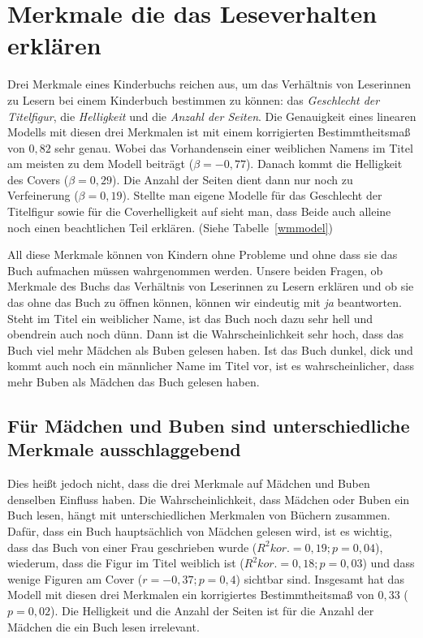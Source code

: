 \chapter{Merkmale die das Leseverhalten erklären}

Drei Merkmale eines Kinderbuchs reichen aus, um das Verhältnis von
Leserinnen zu Lesern bei einem Kinderbuch bestimmen zu können: das
\emph{Geschlecht der Titelfigur}, die \emph{Helligkeit} und die
\emph{Anzahl der Seiten}. Die Genauigkeit eines linearen Modells mit
diesen drei Merkmalen ist mit einem korrigierten Bestimmtheitsmaß von
$0{,}82$ sehr genau. Wobei das Vorhandensein einer weiblichen Namens im
Titel am meisten zu dem Modell beiträgt ($\beta=-0{,}77$). Danach kommt
die Helligkeit des Covers ($\beta=0{,}29$). Die Anzahl der Seiten dient
dann nur noch zu Verfeinerung ($\beta=0{,}19$). Stellte man eigene
Modelle für das Geschlecht der Titelfigur sowie für die Coverhelligkeit
auf sieht man, dass Beide auch alleine noch einen beachtlichen Teil
erklären. (Siehe Tabelle~\ref{wmmodel})

All diese Merkmale können von Kindern ohne Probleme und ohne dass sie
das Buch aufmachen müssen wahrgenommen werden. Unsere beiden Fragen, ob
Merkmale des Buchs das Verhältnis von Leserinnen zu Lesern erklären und
ob sie das ohne das Buch zu öffnen können, können wir eindeutig mit
\emph{ja} beantworten. Steht im Titel ein weiblicher Name, ist das Buch
noch dazu sehr hell und obendrein auch noch dünn. Dann ist die
Wahrscheinlichkeit sehr hoch, dass das Buch viel mehr Mädchen als Buben
gelesen haben. Ist das Buch dunkel, dick und kommt auch noch ein
männlicher Name im Titel vor, ist es wahrscheinlicher, dass mehr Buben
als Mädchen das Buch gelesen haben.



\section{Für Mädchen und Buben sind unterschiedliche Merkmale
ausschlaggebend}

Dies heißt jedoch nicht, dass die drei Merkmale auf Mädchen und Buben
denselben Einfluss haben. Die Wahrscheinlichkeit, dass Mädchen oder
Buben ein Buch lesen, hängt mit unterschiedlichen Merkmalen von Büchern
zusammen. Dafür, dass ein Buch hauptsächlich von Mädchen gelesen wird,
ist es wichtig, dass das Buch von einer Frau geschrieben wurde
($R^2 \scriptstyle kor.\textstyle =0{,}19; p=0{,}04$), wiederum, dass
die Figur im Titel weiblich ist
($R^{2}\scriptstyle kor.\textstyle =0{,}18; p=0{,}03$) und dass wenige
Figuren am Cover ($r=-0{,}37; p=0{,}4$) sichtbar sind. Insgesamt hat das
Modell mit diesen drei Merkmalen ein korrigiertes Bestimmtheitsmaß von
$0{,}33$ ($p=0{,}02$). Die Helligkeit und die Anzahl der Seiten ist für
die Anzahl der Mädchen die ein Buch lesen irrelevant.

